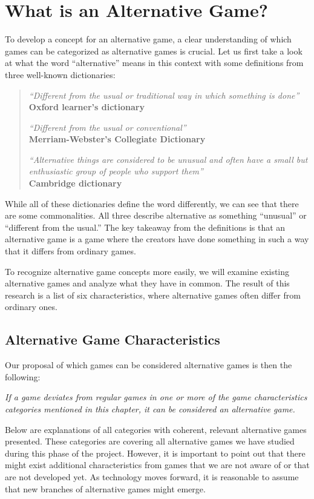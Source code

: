 \documentclass[../Main.tex]{subfiles}
\begin{document}
\section{What is an Alternative Game?}
\label{chap:what_is_alternative}
To develop a concept for an alternative game, a clear understanding of which games can be categorized as alternative games is crucial. Let us first take a look at what the word “alternative” means in this context with some definitions from three well-known dictionaries:

\blockquote{
    \textit{“Different from the usual or traditional way in which something is done”} \\
    \textbf{Oxford learner's dictionary}
    
    \textit{“Different from the usual or conventional”} \\
    \textbf{Merriam-Webster's Collegiate Dictionary}
     
    \textit{“Alternative things are considered to be unusual and often have a small but enthusiastic group of people who support them”} \\
    \textbf{Cambridge dictionary}
}

While all of these dictionaries define the word differently, we can see that there are some commonalities. All three describe alternative as something “unusual” or “different from the usual.” The key takeaway from the definitions is that an alternative game is a game where the creators have done something in such a way that it differs from ordinary games.

To recognize alternative game concepts more easily, we will examine existing alternative games and analyze what they have in common. The result of this research is a list of six characteristics, where alternative games often differ from ordinary ones.

\subsection{Alternative Game Characteristics}
Our proposal of which games can be considered alternative games is then the following:

\textit{If a game deviates from regular games in one or more of the game characteristics categories mentioned in this chapter, it can be considered an alternative game.}

Below are explanations of all categories with coherent, relevant alternative games presented. These categories are covering all alternative games we have studied during this phase of the project. However, it is important to point out that there might exist additional characteristics from games that we are not aware of or that are not developed yet. As technology moves forward, it is reasonable to assume that new branches of alternative games might emerge.
\end{document}
